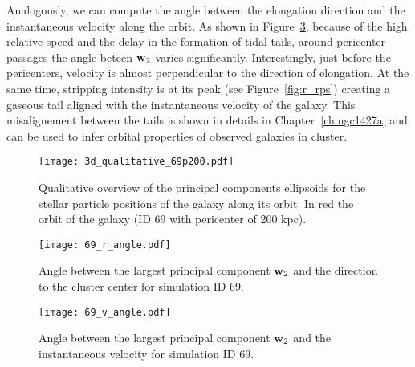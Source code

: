 Analogously, we can compute the angle between the elongation direction and the instantaneous velocity along the orbit.
As shown in Figure~\ref{fig:pca_angle_v}, because of the high relative speed and the delay in the formation of tidal tails, around pericenter passages the angle beteen $\boldsymbol{\mathbf{w}}_2$ varies significantly.
Interestingly, just before the pericenters, velocity is almost perpendicular to the direction of elongation.
At the same time, stripping intensity is at its peak (see Figure~\ref{fig:r_rps}) creating a gaseous tail aligned with the instantaneous velocity of the galaxy.
This misalignement between the tails is shown in details in Chapter~\ref{ch:ngc1427a} and can be used to infer orbital properties of observed galaxies in cluster.

\begin{figure}
\centering
\texttt{[image: 3d\_qualitative\_69p200.pdf]}
\caption{Qualitative overview of the principal components ellipsoids for the stellar particle positions of the galaxy along its orbit.
In red the orbit of the galaxy (ID 69 with pericenter of 200 kpc).}
\label{fig:pca}
\end{figure}

\begin{figure}
\centering
\texttt{[image: 69\_r\_angle.pdf]}
\caption{Angle between the largest principal component $\boldsymbol{\mathbf{w}}_2$ and the direction to the cluster center for simulation ID 69.}
\label{fig:pca_angle_r}
\end{figure}
\begin{figure}
\centering
\texttt{[image: 69\_v\_angle.pdf]}
\caption{Angle between the largest principal component $\boldsymbol{\mathbf{w}}_2$ and the instantaneous velocity for simulation ID 69.}
\label{fig:pca_angle_v}
\end{figure}

